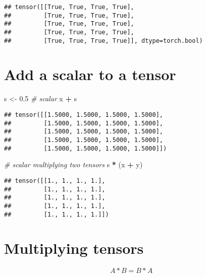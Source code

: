 \documentclass[]{book}
\newenvironment{Shaded}{\begin{snugshade}}{\end{snugshade}}
\newcommand{\CommentTok}[1]{\textcolor[rgb]{0.56,0.35,0.01}{\textit{#1}}}
\newcommand{\DataTypeTok}[1]{\textcolor[rgb]{0.13,0.29,0.53}{#1}}
\newcommand{\FloatTok}[1]{\textcolor[rgb]{0.00,0.00,0.81}{#1}}
\newcommand{\KeywordTok}[1]{\textcolor[rgb]{0.13,0.29,0.53}{\textbf{#1}}}
\newcommand{\NormalTok}[1]{#1}
\newcommand{\OperatorTok}[1]{\textcolor[rgb]{0.81,0.36,0.00}{\textbf{#1}}}
\newcommand{\StringTok}[1]{\textcolor[rgb]{0.31,0.60,0.02}{#1}}
\begin{document}
\begin{verbatim}
## tensor([[True, True, True, True],
##         [True, True, True, True],
##         [True, True, True, True],
##         [True, True, True, True],
##         [True, True, True, True]], dtype=torch.bool)
\end{verbatim}

\hypertarget{add-a-scalar-to-a-tensor}{%
\section{Add a scalar to a tensor}\label{add-a-scalar-to-a-tensor}}

\begin{Shaded}
\begin{Highlighting}[]
\NormalTok{s <-}\StringTok{ }\FloatTok{0.5}    \CommentTok{# scalar}
\NormalTok{x }\OperatorTok{+}\StringTok{ }\NormalTok{s}
\end{Highlighting}
\end{Shaded}

\begin{verbatim}
## tensor([[1.5000, 1.5000, 1.5000, 1.5000],
##         [1.5000, 1.5000, 1.5000, 1.5000],
##         [1.5000, 1.5000, 1.5000, 1.5000],
##         [1.5000, 1.5000, 1.5000, 1.5000],
##         [1.5000, 1.5000, 1.5000, 1.5000]])
\end{verbatim}

\begin{Shaded}
\begin{Highlighting}[]
\CommentTok{# scalar multiplying two tensors}
\NormalTok{s }\OperatorTok{*}\StringTok{ }\NormalTok{(x }\OperatorTok{+}\StringTok{ }\NormalTok{y)}
\end{Highlighting}
\end{Shaded}

\begin{verbatim}
## tensor([[1., 1., 1., 1.],
##         [1., 1., 1., 1.],
##         [1., 1., 1., 1.],
##         [1., 1., 1., 1.],
##         [1., 1., 1., 1.]])
\end{verbatim}

\hypertarget{multiplying-tensors}{%
\section{Multiplying tensors}\label{multiplying-tensors}}

\[A * B = B * A\]

\begin{Shaded}
\end{Shaded}
\end{document}
